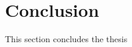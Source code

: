 \documentclass[../main.tex]{subfiles}
\begin{document}
\section{Conclusion}
    This section concludes the thesis
\end{document}

